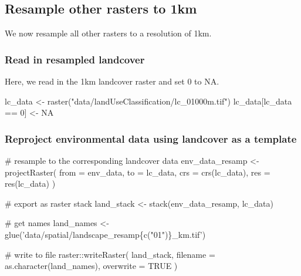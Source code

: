 \documentclass[
]{article}
\newenvironment{Shaded}{}{}
\newcommand{\CommentTok}[1]{\textcolor[rgb]{0.00,0.50,0.00}{#1}}
\newcommand{\DataTypeTok}[1]{#1}
\newcommand{\DecValTok}[1]{#1}
\newcommand{\KeywordTok}[1]{\textcolor[rgb]{0.00,0.00,1.00}{#1}}
\newcommand{\NormalTok}[1]{#1}
\newcommand{\OperatorTok}[1]{#1}
\newcommand{\OtherTok}[1]{\textcolor[rgb]{1.00,0.25,0.00}{#1}}
\newcommand{\StringTok}[1]{\textcolor[rgb]{0.00,0.50,0.50}{#1}}
\begin{document}
\hypertarget{resample-other-rasters-to-1km}{%
\subsection{Resample other rasters to 1km}\label{resample-other-rasters-to-1km}}

We now resample all other rasters to a resolution of 1km.

\hypertarget{read-in-resampled-landcover}{%
\subsubsection{Read in resampled landcover}\label{read-in-resampled-landcover}}

Here, we read in the 1km landcover raster and set 0 to NA.

\begin{Shaded}
\begin{Highlighting}[]
\NormalTok{lc_data <-}\StringTok{ }\KeywordTok{raster}\NormalTok{(}\StringTok{"data/landUseClassification/lc_01000m.tif"}\NormalTok{)}
\NormalTok{lc_data[lc_data }\OperatorTok{==}\StringTok{ }\DecValTok{0}\NormalTok{] <-}\StringTok{ }\OtherTok{NA}
\end{Highlighting}
\end{Shaded}

\hypertarget{reproject-environmental-data-using-landcover-as-a-template}{%
\subsubsection{Reproject environmental data using landcover as a template}\label{reproject-environmental-data-using-landcover-as-a-template}}

\begin{Shaded}
\begin{Highlighting}[]
\CommentTok{# resample to the corresponding landcover data}
\NormalTok{env_data_resamp <-}\StringTok{ }\KeywordTok{projectRaster}\NormalTok{(}
  \DataTypeTok{from =}\NormalTok{ env_data, }\DataTypeTok{to =}\NormalTok{ lc_data,}
  \DataTypeTok{crs =} \KeywordTok{crs}\NormalTok{(lc_data), }\DataTypeTok{res =} \KeywordTok{res}\NormalTok{(lc_data)}
\NormalTok{)}

\CommentTok{# export as raster stack}
\NormalTok{land_stack <-}\StringTok{ }\KeywordTok{stack}\NormalTok{(env_data_resamp, lc_data)}

\CommentTok{# get names}
\NormalTok{land_names <-}\StringTok{ }\KeywordTok{glue}\NormalTok{(}\StringTok{'data/spatial/landscape_resamp\{c("01")\}_km.tif'}\NormalTok{)}

\CommentTok{# write to file}
\NormalTok{raster}\OperatorTok{::}\KeywordTok{writeRaster}\NormalTok{(}
\NormalTok{  land_stack, }\DataTypeTok{filename =} \KeywordTok{as.character}\NormalTok{(land_names), }
  \DataTypeTok{overwrite =} \OtherTok{TRUE}
\NormalTok{)}
\end{Highlighting}
\end{Shaded}
\end{document}
